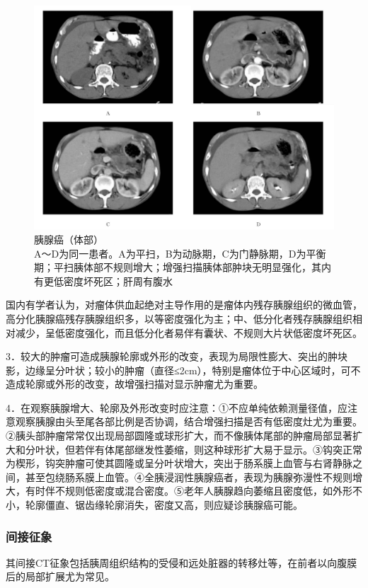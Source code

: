 \begin{figure}[!htbp]
 \centering
 \includegraphics[width=.7\textwidth,height=\textheight,keepaspectratio]{./images/Image00304.jpg}
 \captionsetup{justification=centering}
 \caption{胰腺癌（体部）\\{\small A～D为同一患者。A为平扫，B为动脉期，C为门静脉期，D为平衡期；平扫胰体部不规则增大；增强扫描胰体部肿块无明显强化，其内有更低密度坏死区；肝周有腹水}}
 \label{fig13-3}
  \end{figure} 

国内有学者认为，对瘤体供血起绝对主导作用的是瘤体内残存胰腺组织的微血管，高分化胰腺癌残存胰腺组织多，以等密度强化为主；中、低分化者残存胰腺组织相对减少，呈低密度强化，而且低分化者易伴有囊状、不规则大片状低密度坏死区。

3．较大的肿瘤可造成胰腺轮廓或外形的改变，表现为局限性膨大、突出的肿块影，边缘呈分叶状；较小的肿瘤（直径≤2cm），特别是瘤体位于中心区域时，可不造成轮廓或外形的改变，故增强扫描对显示肿瘤尤为重要。

4．在观察胰腺增大、轮廓及外形改变时应注意：①不应单纯依赖测量径值，应注意观察胰腺由头至尾各部比例是否协调，结合增强扫描是否有低密度灶尤为重要。②胰头部肿瘤常常仅出现局部圆隆或球形扩大，而不像胰体尾部的肿瘤局部显著扩大和分叶状，但若伴有体尾部继发性萎缩，则这种球形扩大易于显示。③钩突正常为楔形，钩突肿瘤可使其圆隆或呈分叶状增大，突出于肠系膜上血管与右肾静脉之间，甚至包绕肠系膜上血管。④全胰浸润性胰腺癌者，表现为胰腺弥漫性不规则增大，有时伴不规则低密度或混合密度。⑤老年人胰腺趋向萎缩且密度低，如外形不小，轮廓僵直、锯齿缘轮廓消失，密度又高，则应疑诊胰腺癌可能。

\subsubsection{间接征象}

其间接CT征象包括胰周组织结构的受侵和远处脏器的转移灶等，在前者以向腹膜后的局部扩展尤为常见。

